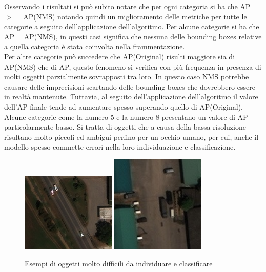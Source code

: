 Osservando i risultati si può subito notare che per ogni categoria si ha che AP$>=$AP(NMS) notando quindi un miglioramento delle metriche per tutte le categorie a seguito dell'applicazione dell'algoritmo. Per alcune categorie si ha che AP$=$AP(NMS), in questi casi significa che nessuna delle bounding boxes relative a quella categoria è stata coinvolta nella frammentazione.\\
Per altre categorie può succedere che AP(Original) risulti maggiore sia di AP(NMS) che di AP, questo fenomeno si verifica con più frequenza in presenza di molti oggetti parzialmente sovrapposti tra loro. In questo caso NMS potrebbe causare delle imprecisioni scartando delle bounding boxes che dovrebbero essere in realtà mantenute. Tuttavia, al seguito dell'applicazione dell'algoritmo il valore dell'AP finale tende ad aumentare spesso superando quello di AP(Original).\\
Alcune categorie come la numero 5 e la numero 8 presentano un valore di AP particolarmente basso. Si tratta di oggetti che a causa della bassa risoluzione risultano molto piccoli ed ambigui perfino per un occhio umano, per cui, anche il modello spesso commette errori nella loro individuazione e classificazione.
\begin{figure}
\begin{center}
\includegraphics[width=0.4\textwidth, height=0.25\textheight]{images/auto1-satellite.jpg}
\includegraphics[width=0.4\textwidth, height=0.25\textheight]{images/auto2-satellite.jpg}
\end{center}
\caption{Esempi di oggetti molto difficili da individuare e classificare}
\end{figure}

